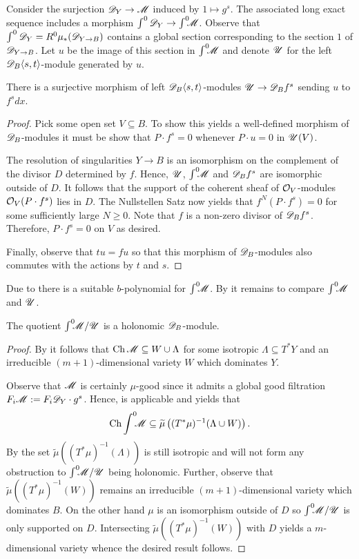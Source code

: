 Consider the surjection $\mathscr{D}_Y\to \mathscr{M}$ induced by $1 \mapsto g^s$.
The associated long exact sequence includes a morphism $\int^0\mathscr{D}_Y \to \int^0 \mkern -8mu\mathscr{M}$.
Observe that $\int^0\mathscr{D}_Y = R^0 \mu_*(\mathscr{D}_{Y\to B})$ contains a global section corresponding to the section $1$ of $\mathscr{D}_{Y\to B}$.
Let $u$ be the image of this section in $\int^0 \mkern -8mu\mathscr{M}$ and denote $\mathscr{U}$ for the left $\mathscr{D}_B\langle s,t\rangle$-module generated by $u$.
\begin{lemma}\label{lem: SurjectiveUf}
  There is a surjective morphism of left $\mathscr{D}_B\langle s,t\rangle$-modules $\mathscr{U} \to \mathscr{D}_B f^s$ sending $u$ to $f^s dx$.
\end{lemma}
\begin{proof}
  Pick some open set $V\subseteq B$. To show this yields a well-defined morphism of $\mathscr{D}_B$-modules it must be show that $P \cdot f^s  = 0$ whenever $P\cdot u = 0$ in $\mathscr{U}(V)$.

  The resolution of singularities $Y\to B$ is an isomorphism on the complement of the divisor $D$ determined by $f$.
  Hence, $\mathscr{U}$, $\int^0 \mkern -8mu \mathscr{M}$ and $\mathscr{D}_B f^s$ are isomorphic outside of $D$.
  It follows that the support of the coherent sheaf of $\mathcal{O}_V$-modules $\mathcal{O}_V (P\cdot f^s)$ lies in $D$.
  The Nullstellen Satz now yields that $f^N (P\cdot f^s)    = 0$ for some sufficiently large $N\geq 0$.
  Note that $f$ is a non-zero divisor of $\mathscr{D}_Bf^s$.
  Therefore, $P\cdot f^s = 0$ on $V$ as desired.

  Finally, observe that $tu = fu$ so that this morphism of $\mathscr{D}_B$-modules also commutes with the actions by $t$ and $s$.
\end{proof}
Due to  there is a suitable $b$-polynomial for $\int^0 \mkern -8mu \mathscr{M}$.
By  it remains to compare $\int^0 \mkern -8mu\mathscr{M}$ and $\mathscr{U}$.
\begin{lemma}\label{lem: QuotientHolonomic}
  The quotient $\int^0 \mkern -8mu\mathscr{M} / \mathscr{U}$ is a holonomic $\mathscr{D}_B$-module.
\end{lemma}
\begin{proof}
  By  it follows that $\operatorname{Ch} \mathscr{M} \subseteq W \cup \Lambda$ for some isotropic $\Lambda\subseteq T^*Y$ and an irreducible $(m+1)$-dimensional variety $W$ which dominates $Y$.

  Observe that $\mathscr{M}$ is certainly $\mu$-good since it admits a global good filtration $F_i\mathscr{M} :=  F_i\mathscr{D}_Y\cdot g^s $.
  Hence,  is applicable and yields that
  $$\operatorname{Ch} \int^0 \mkern -8mu \mathscr{M} \subseteq \widetilde{\mu}\left((T^*\mu)^{-1} (\Lambda \cup W)\right).$$
  By  the set $\widetilde{\mu}((T^*\mu)^{-1}(\Lambda))$ is still isotropic and will not form any obstruction to $\int^0 \mkern -8mu\mathscr{M}/\mathscr{U}$ being holonomic.
  Further, observe that $\widetilde{\mu}((T^*\mu)^{-1}(W))$ remains an irreducible $(m+1)$-dimensional variety which dominates $B$.
  On the other hand $\mu$ is an isomorphism outside of $D$ so $\int^0 \mkern -8mu\mathscr{M}/\mathscr{U}$ is only supported on $D$.
  Intersecting $\widetilde{\mu}((T^*\mu)^{-1}(W))$ with $D$ yields a $m$-dimensional variety whence the desired result follows.
\end{proof}
